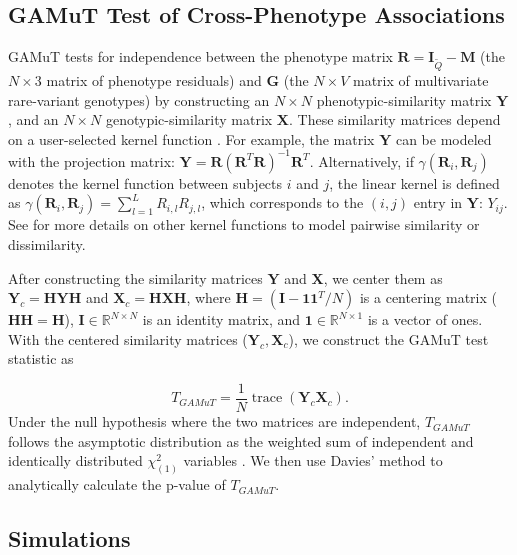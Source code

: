 \documentclass[]{article}
\DeclareMathOperator{\trace}{trace}
\theoremstyle{definition}
\theoremstyle{definition}
\theoremstyle{definition}
\theoremstyle{remark}
\begin{document}
\hypertarget{gamut-test-of-cross-phenotype-associations}{%
\subsection{GAMuT Test of Cross-Phenotype
Associations}\label{gamut-test-of-cross-phenotype-associations}}

GAMuT tests for independence between the phenotype matrix
\(\mathbf{R}=\mathbf{I}_{\tilde{Q}}-\mathbf{M}\) (the \(N \times 3\)
matrix of phenotype residuals) and \(\mathbf{G}\) (the \(N \times V\)
matrix of multivariate rare-variant genotypes) by constructing an
\(N \times N\) phenotypic-similarity matrix \(\mathbf{Y}\), and an
\(N \times N\) genotypic-similarity matrix \(\mathbf{X}\). These
similarity matrices depend on a user-selected kernel function
\citep{Kwee2008, Schaid2010, Wu2010, Wu2011}. For example, the matrix
\(\mathbf{Y}\) can be modeled with the projection matrix:
\(\mathbf{Y} = \mathbf{R} (\mathbf{R}^T\mathbf{R})^{-1}\mathbf{R}^T\).
Alternatively, if \(\gamma(\mathbf{R}_i,\mathbf{R}_j)\) denotes the
kernel function between subjects \(i\) and \(j\), the linear kernel is
defined as
\(\gamma(\mathbf{R}_i,\mathbf{R}_j)= \sum_{l=1}^L R_{i,l} R_{j,l}\),
which corresponds to the \((i,j)\) entry in \(\mathbf{Y}\): \(Y_{ij}\).
See \citet{Broadaway2016} for more details on other kernel functions to
model pairwise similarity or dissimilarity.

After constructing the similarity matrices \(\mathbf{Y}\) and
\(\mathbf{X}\), we center them as \(\mathbf{Y}_c = \mathbf{HYH}\) and
\(\mathbf{X}_c = \mathbf{HXH}\), where
\(\mathbf{H}=(\mathbf{I}-\mathbf{11}^T/N)\) is a centering matrix
(\(\mathbf{HH} = \mathbf{H}\)),
\(\mathbf{I} \in \mathbb{R}^{N \times N}\) is an identity matrix, and
\(\mathbf{1} \in \mathbb{R}^{N \times 1}\) is a vector of ones. With the
centered similarity matrices (\(\mathbf{Y}_c, \mathbf{X}_c\)), we
construct the GAMuT test statistic as

\[
T_{GAMuT}=\frac{1}{N}\trace(\mathbf{Y}_c\mathbf{X}_c).
\] Under the null hypothesis where the two matrices are independent,
\(T_{GAMuT}\) follows the asymptotic distribution as the weighted sum of
independent and identically distributed \(\chi^2_{(1)}\) variables
\citep{Broadaway2016}. We then use Davies' method \citep{Davies1980} to
analytically calculate the p-value of \(T_{GAMuT}\).

\hypertarget{simulations}{%
\subsection{Simulations}\label{simulations}}
\end{document}
